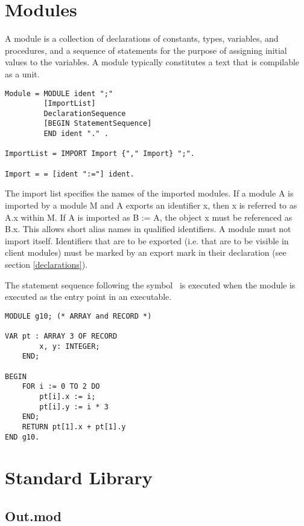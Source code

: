 \documentclass[12pt]{article}
\begin{document}
\section{Modules}
\label{modules}

A module is a collection of declarations of constants, types, variables, and procedures, and a sequence of statements for the purpose of assigning initial values to the variables. A module typically constitutes a text that is compilable as a unit.

\begin{lstlisting}[style=ebnf]
Module = MODULE ident ";"
         [ImportList] 
         DeclarationSequence 
         [BEGIN StatementSequence] 
         END ident "." .

ImportList = IMPORT Import {"," Import} ";".

Import = = [ident ":="] ident.
\end{lstlisting} 

The import list specifies the names of the imported modules. If a module A is imported by a module M and A exports an identifier x, then x is referred to as A.x within M. If A is imported as B := A, the object x must be referenced as B.x. This allows short alias names in qualified identifiers. A module must not import itself. Identifiers that are to be exported (i.e. that are to be visible in client modules) must be marked by an export mark in their declaration (see section \ref{declarations}).


The statement sequence following the symbol \BEGIN\ is executed when the module is executed as the entry point in an executable.

\begin{lstlisting}[style=oberon]
MODULE g10; (* ARRAY and RECORD *)
    
VAR pt : ARRAY 3 OF RECORD
        x, y: INTEGER;
    END;

BEGIN
    FOR i := 0 TO 2 DO
        pt[i].x := i;
        pt[i].y := i * 3
    END;
    RETURN pt[1].x + pt[1].y
END g10.    
\end{lstlisting} 

\section{Standard Library}

\subsection{Out.mod}
\end{document}
